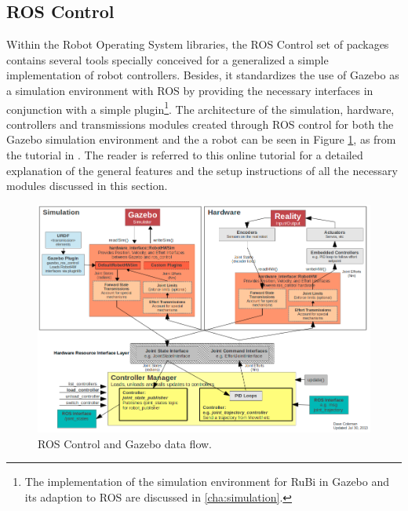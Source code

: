 
\subsection{ROS Control} %
\label{sub:ros_control}
Within the Robot Operating System libraries, the ROS Control set of packages \cite{ros_control} contains several tools specially conceived for a generalized a simple implementation of robot controllers.
Besides, it standardizes the use of Gazebo \cite{gazebo} as a simulation environment with ROS by providing the necessary interfaces in conjunction with a simple plugin\footnote{The implementation of the simulation environment for RuBi in Gazebo and its adaption to ROS are discussed in \ref{cha:simulation}.}.
The architecture of the simulation, hardware, controllers and transmissions modules created through ROS control for both the Gazebo simulation environment and the a robot can be seen in Figure \ref{fig:ros_control_gazebo}, as from the tutorial in \cite{ros_control_tutorial}. The reader is referred to this online tutorial for a detailed explanation of the general features and the setup instructions of all the necessary modules discussed in this section.

\begin{figure}[ht]
	\centering
	\includegraphics[width=\textwidth]{figures/ros_control_gazebo.png} 
	\caption{ROS Control and Gazebo data flow.}
	\label{fig:ros_control_gazebo}
\end{figure}

